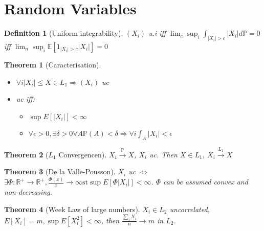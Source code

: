 \documentclass{article}
\newtheorem{theorem}{Theorem}
\newtheorem{definition}{Definition}
\begin{document}
\section{Random Variables}
\begin{definition}[Uniform integrability]
  $(X_i)$ u.i iff $\lim_c \sup_i \int_{|X_i| > c} |X_i|d\mathbb P = 0$
  iff $\lim_n \sup_i \mathbb E[1_{|X_i| > c}|X_i|]  = 0$
\end{definition}
\begin{theorem}[Caracterisation]
  \begin{itemize}
  \item $\forall i |X_i| \le X \in L_1 \Rightarrow (X_i)$ uc
  \item uc iff:
    \begin{itemize}
    \item $\sup E[|X_i|] < \infty$
    \item $\forall \epsilon > 0, \exists \delta > 0 \forall A \mathbb P(A) < \delta \Rightarrow  \forall i \int_A |X_i| < \epsilon$
    \end{itemize}
  \end{itemize}
\end{theorem}
\begin{theorem}[$L_1$ Convergencen]
  $X_i \overset{\mathbb P}{\rightarrow} X$, $X_i$ uc. Then $X \in L_1$, $X_i \overset{L_1}{\rightarrow} X$
  
\end{theorem}
\begin{theorem}[De la Valle-Pousson]
  $X_i$ uc $\iff$ $\exists \Phi: \mathbb R^+ \rightarrow \mathbb R^+,\frac{\Phi(x)}{x}\rightarrow \infty \text{st} \sup E[\Phi |X_i|] < \infty$.
  $\Phi$ can be assumed convex and non-decreasing.
\end{theorem}

\begin{theorem}[Week Law of large numbers]
  $X_i \in L_2$ uncorrelated, $E[X_i] = m, \sup E[X_i^2] < \infty$, then $\frac{\sum_i X_i}{n} \rightarrow m$ in $L_2$.
\end{theorem}
\end{document}
